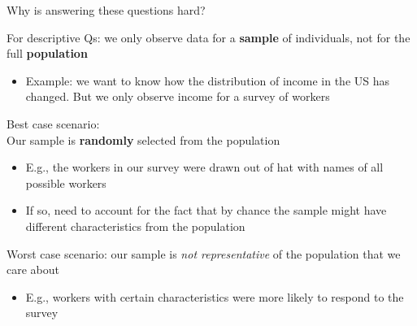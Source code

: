 \documentclass[11pt,english,handout]{beamer}
\newenvironment{wideitemize}{\itemize\addtolength{\itemsep}{10pt}}{\enditemize}
\begin{document}
\begin{frame}{Why is answering these questions hard?}

\begin{wideitemize}
\item
For descriptive Qs: we only observe data for a \textbf{sample} of individuals, not for the full \textbf{population}
	\begin{itemize}
		\item 
		Example: we want to know how the distribution of income in the US has changed. But we only observe income for a survey of workers
	\end{itemize}
\pause

\item Best case scenario: \\Our sample is \textbf{randomly} selected from the population \\
	\begin{itemize}
		\item 
		E.g., the workers in our survey were drawn out of hat with names of all possible workers
		
		\item
		If so, need to account for the fact that by chance the sample might have different characteristics from the population
	\end{itemize}


\pause
\item Worst case scenario: our sample is \textit{not representative} of the population that we care about
	\begin{itemize}
		\item 
		E.g., workers with certain characteristics were more likely to respond to the survey
	\end{itemize}
\end{wideitemize}

\end{frame}
\end{document}
